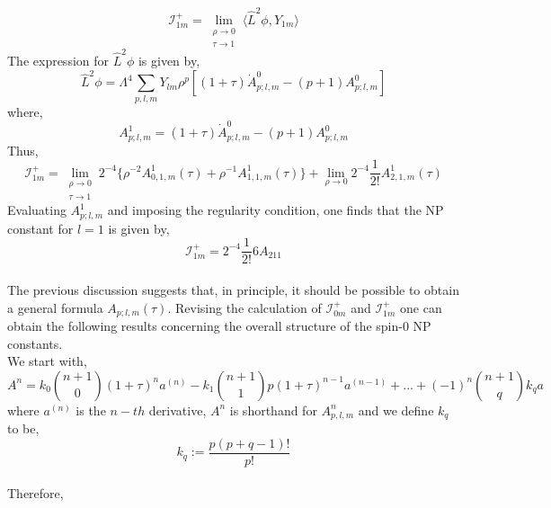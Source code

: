 \documentclass[
11pt, %
english, %
singlespacing, %
headsepline, %
]{MastersDoctoralThesis} %
\begin{document}
$$\mathcal{I}^+_{1m} = \lim_{\substack{\rho \to 0 \\ \tau \to 1}} \langle\hat{L}^2\phi, Y_{1m}\rangle$$
The expression for $\hat{L}^2\phi$ is given by,
$$\hat{L}^2\phi = \Lambda^4 \sum_{p,l,m}Y_{lm}\rho^p[(1+\tau)\dot{A}^0_{p;l,m} - (p+1)A^0_{p;l,m}]$$
where,
$$A^1_{p;l,m} = (1+\tau)\dot{A}^0_{p;l,m} - (p+1)A^0_{p;l,m}$$
Thus,
$$\mathcal{I}^+_{1m} = \lim_{\substack{\rho \to 0 \\ \tau \to 1}}2^{-4} \{\rho^{-2}A^1_{0,1,m}(\tau) + \rho^{-1}A^1_{1,1,m}(\tau)\} + \lim_{\rho \to 0} 2^{-4}\frac{1}{2!}A^1_{2,1,m}(\tau)$$
Evaluating $A^1_{p;l,m}$ and imposing the regularity condition, one finds that the NP constant for $l = 1$ is given by,
$$\mathcal{I}^+_{1m} = 2^{-4} \frac{1}{2!}6A_{211}$$
\\
The previous discussion suggests that, in principle, it should be possible to obtain a general formula $A_{p;l,m}(\tau)$. Revising the calculation of $\mathcal{I}^+_{0m}$ and $\mathcal{I}^+_{1m}$ one can obtain the following results concerning the overall structure of the spin-0 NP constants.
\\
We start with,
$$A^n = k_0\binom{n+1}{0}(1+\tau)^n a^{(n)} - k_1\binom{n+1}{1}p(1+\tau)^{n-1}a^{(n-1)}+...+(-1)^n\binom{n+1}{q}k_q a$$
where $a^{(n)}$ is the $n-th$ derivative, $A^{n}$ is shorthand for $A^{n}_{p,l,m}$ and we define $k_q$ to be,
$$k_q := \frac{p(p+q-1)!}{p!}$$
\\
Therefore,
\end{document}
